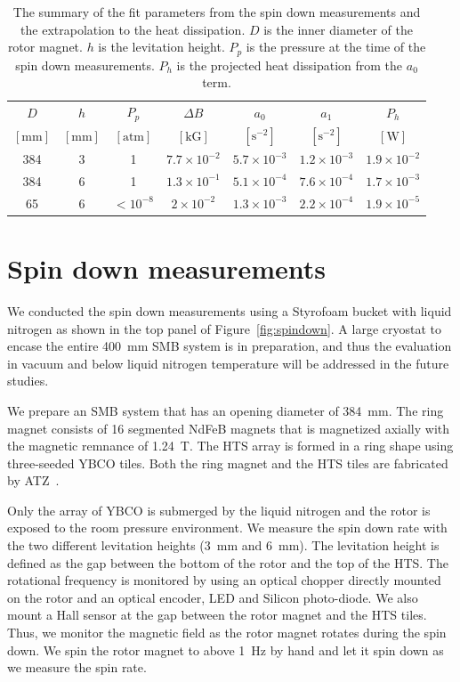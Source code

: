 \documentclass[journal]{IEEEtran}
\begin{document}
\begin{table}[tb]
   \centering
   \begin{tabular}{c|c|c|c|c|c|c} %
	    $D$ & $h$& $P_p$ & $\Delta B$ &$a_0$ & $a_1$  & $P_h$\\
	     $[\mbox{mm}]$ & $[\mbox{mm}]$ & $[\mbox{atm}]$ & $[\mbox{kG}]$ & $[\mbox{s}^{-2}]$  & $[\mbox{s}^{-2}]$  & $[\mbox{W}]$ \\ \hline
        384 & 3  & 1  & $7.7\times10^{-2}$ & $5.7\times10^{-3}$  & $1.2\times10^{-3}$ & $1.9\times10^{-2}$\\
	384 & 6  &  1 & $1.3\times10^{-1}$ & $5.1\times10^{-4}$ & $7.6\times10^{-4}$ & $1.7\times10^{-3}$\\
	65 & 6   &  $<10^{-8}$ & $2\times10^{-2}$ & $1.3\times10^{-3}$ & $2.2\times10^{-4}$ & $1.9\times10^{-5}$
   \end{tabular}
   \caption{The summary of the fit parameters from the spin down measurements and the extrapolation to the heat dissipation.
     $D$ is the inner diameter of the rotor magnet.
     $h$ is the levitation height.
     $P_p$ is the pressure at the time of the spin down measurements.
     $P_h$ is the projected heat dissipation from the $a_0$ term.}
   \label{tab:fitpar}
\end{table}

\section{Spin down measurements}
We conducted the spin down measurements using a Styrofoam bucket with liquid nitrogen as shown in the top panel of Figure~\ref{fig:spindown}.
A large cryostat to encase the entire 400~mm SMB system is in preparation, and thus the evaluation in vacuum and below liquid nitrogen temperature will be addressed in the future studies.

We prepare an SMB system that has an opening diameter of 384~mm.
The ring magnet consists of 16 segmented NdFeB magnets that is magnetized axially with the magnetic remnance of 1.24~T.
The HTS array is formed in a ring shape using three-seeded YBCO tiles.
Both the ring magnet and the HTS tiles are fabricated by ATZ~\cite{atz}.

Only the array of YBCO is submerged by the liquid nitrogen and the rotor is exposed to the room pressure environment.
We measure the spin down rate with the two different levitation heights (3~mm and 6~mm).
The levitation height is defined as the gap between the bottom of the rotor and the top of the HTS.
The rotational frequency is monitored by using an optical chopper directly mounted on the rotor and an optical encoder, LED and Silicon photo-diode.
We also mount a Hall sensor at the gap between the rotor magnet and the HTS tiles.
Thus, we monitor the magnetic field as the rotor magnet rotates during the spin down.
We spin the rotor magnet to above 1~Hz by hand and let it spin down as we measure the spin rate.
\end{document}
